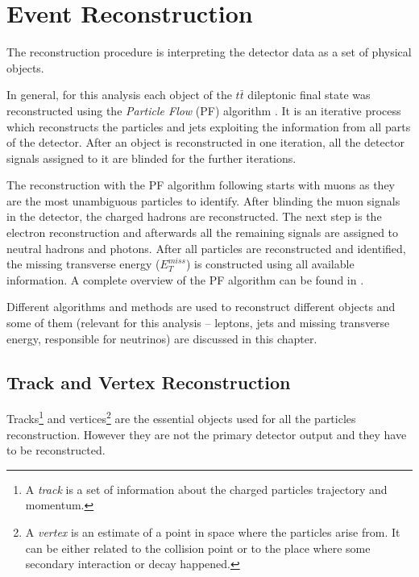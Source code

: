 \chapter{Event Reconstruction}\label{chapt:event_selection}

The reconstruction procedure is interpreting the detector data as a set of physical objects.

In general, for this analysis each object of the $t\bar{t}$ dileptonic final state was reconstructed using the \textit{Particle Flow} (PF)
algorithm \cite{Beaudette:2014cea}. It is an iterative process which reconstructs the particles and jets exploiting the information from all parts
of the detector. After an object is reconstructed in one iteration, all the detector signals assigned to it are blinded for the further iterations.

The reconstruction with the PF algorithm following \cite{Beaudette:2014cea} starts with muons as they are the most unambiguous particles to identify.
After blinding the muon signals in the detector, the charged hadrons are reconstructed. The next step is the electron reconstruction and afterwards
all the remaining signals are assigned to neutral hadrons and photons. After all particles are reconstructed and identified, the missing transverse
energy ($E_{T}^{miss}$) is constructed using all available information. A complete overview of the PF algorithm can be found in \cite{CMS-PAS-PFT-09-001}. 

Different algorithms and methods are used to reconstruct different objects and some of them (relevant for this analysis -- leptons, jets and missing transverse
energy, responsible for neutrinos) are discussed in this chapter. 

\section{Track and Vertex Reconstruction}

Tracks\footnote{A \textit{track} is a set of information about the charged particles trajectory and momentum.} and vertices\footnote{A 
\textit{vertex} is an estimate of a point in space where the particles arise from. It can be either related to the 
collision point or to the place  where some secondary interaction or decay happened.} are the essential objects used for all the particles reconstruction. 
However they are not the primary detector output and they have to be reconstructed.

